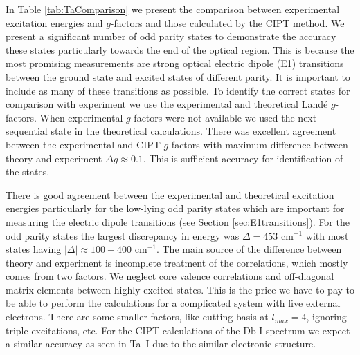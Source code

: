 \documentclass[10pt,a4paper, twoside, openright]{report}
\begin{document}
In Table \ref{tab:TaComparison} we present the comparison between experimental excitation energies and $g$-factors and those calculated by the CIPT method.  We present a significant number of odd parity states to demonstrate the accuracy these states particularly towards the end of the optical region. This is because the most promising measurements are strong optical electric dipole (E1) transitions between the ground state and excited states of different parity. 
It is important to include as many of these transitions as possible. To identify the correct states for comparison with experiment 
we use the experimental and theoretical Land\'{e} $g$-factors. When experimental $g$-factors were not available we used the next sequential state in the theoretical calculations. There was excellent agreement between the experimental and CIPT $g$-factors with maximum difference between theory and experiment $\Delta g \approx 0.1$. This is sufficient accuracy for identification of the states.

There is good agreement between the experimental and theoretical excitation energies particularly for the low-lying odd parity 
states which are important for measuring the electric dipole transitions (see Section \ref{sec:E1transitions}). For the odd parity
states the largest discrepancy in energy was $\Delta = 453$ cm$^{-1}$ with most states having $|\Delta| \approx 100-400$ 
cm$^{-1}$. The main source of the difference between theory and experiment is incomplete treatment of the correlations,
which mostly comes from two factors. We neglect core valence correlations and off-diagonal matrix elements between
highly excited states. This is the price we have to pay to be able to perform the calculations for a
complicated system with five external electrons. There are some smaller factors, like cutting basis at $l_{max}=4$, 
ignoring triple excitations, etc.
For the CIPT calculations of the Db I spectrum we expect a similar accuracy as seen in Ta~I due to the similar electronic structure.\\
\end{document}
